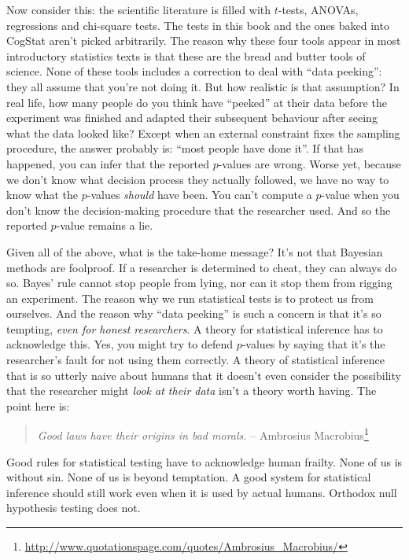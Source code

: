 \documentclass[
  11pt,
  a4paper,
  twoside,symmetric,openright]{book}
\theoremstyle{break}
\theoremstyle{break}
\begin{document}
Now consider this: the scientific literature is filled with \(t\)-tests, ANOVAs, regressions and chi-square tests. The tests in this book and the ones baked into CogStat aren't picked arbitrarily. The reason why these four tools appear in most introductory statistics texts is that these are the bread and butter tools of science. None of these tools includes a correction to deal with ``data peeking'': they all assume that you're not doing it. But how realistic is that assumption? In real life, how many people do you think have ``peeked'' at their data before the experiment was finished and adapted their subsequent behaviour after seeing what the data looked like? Except when an external constraint fixes the sampling procedure, the answer probably is: ``most people have done it''. If that has happened, you can infer that the reported \(p\)-values are wrong. Worse yet, because we don't know what decision process they actually followed, we have no way to know what the \(p\)-values \emph{should} have been. You can't compute a \(p\)-value when you don't know the decision-making procedure that the researcher used. And so the reported \(p\)-value remains a lie.

Given all of the above, what is the take-home message? It's not that Bayesian methods are foolproof. If a researcher is determined to cheat, they can always do so. Bayes' rule cannot stop people from lying, nor can it stop them from rigging an experiment. The reason why we run statistical tests is to protect us from ourselves. And the reason why ``data peeking'' is such a concern is that it's so tempting, \emph{even for honest researchers}. A theory for statistical inference has to acknowledge this. Yes, you might try to defend \(p\)-values by saying that it's the researcher's fault for not using them correctly. A theory of statistical inference that is so utterly naive about humans that it doesn't even consider the possibility that the researcher might \emph{look at their data} isn't a theory worth having. The point here is:

\begin{quote}
\emph{Good laws have their origins in bad morals.}
-- Ambrosius Macrobius\footnote{\url{http://www.quotationspage.com/quotes/Ambrosius_Macrobius/}}
\end{quote}

Good rules for statistical testing have to acknowledge human frailty. None of us is without sin. None of us is beyond temptation. A good system for statistical inference should still work even when it is used by actual humans. Orthodox null hypothesis testing does not.
\end{document}
